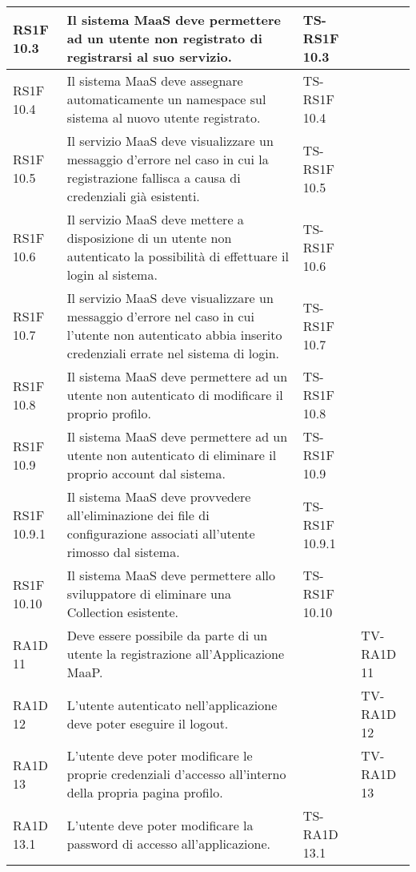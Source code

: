 \begin{center}
\begin{longtable}{| p{2cm} | p{6cm} | p{2.5cm} | p{2.5cm} | }
        RS1F 10.3 & 
        Il sistema MaaS deve permettere ad un utente non registrato di registrarsi al suo servizio. & TS-RS1F 10.3 & \\ \hline 
        RS1F 10.4 & 
        Il sistema MaaS deve assegnare automaticamente un namespace sul sistema al nuovo utente registrato. & TS-RS1F 10.4 & \\ \hline 
        RS1F 10.5 & 
        Il servizio MaaS deve visualizzare un messaggio d’errore nel caso in cui la registrazione fallisca a causa di credenziali già esistenti. & TS-RS1F 10.5 & \\ \hline 
        RS1F 10.6 & 
        Il servizio MaaS deve mettere a disposizione di un utente non autenticato la possibilità di effettuare il login al sistema. & TS-RS1F 10.6 & \\ \hline 
        RS1F 10.7 & 
        Il servizio MaaS deve visualizzare un messaggio d’errore nel caso in cui l’utente non autenticato abbia inserito credenziali errate nel sistema di login. & TS-RS1F 10.7 & \\ \hline 
        RS1F 10.8 & 
        Il sistema MaaS deve permettere ad un utente non autenticato di modificare il proprio profilo. & TS-RS1F 10.8 & \\ \hline 
        RS1F 10.9 & 
        Il sistema MaaS deve permettere ad un utente non autenticato di eliminare il proprio account dal sistema. & TS-RS1F 10.9 & \\ \hline 
        RS1F 10.9.1 & 
        Il sistema MaaS deve provvedere all’eliminazione dei file di configurazione associati all’utente rimosso dal sistema. & TS-RS1F 10.9.1 & \\ \hline 
        RS1F 10.10 & 
        Il sistema MaaS deve permettere allo sviluppatore di eliminare una Collection esistente. & TS-RS1F 10.10 & \\ \hline 
        RA1D 11 & 
        Deve essere possibile da parte di un utente la registrazione all’Applicazione MaaP. &  & TV-RA1D 11 \\ \hline 
        RA1D 12 & 
        L’utente autenticato nell’applicazione deve poter eseguire il logout. &  & TV-RA1D 12 \\ \hline 
        RA1D 13 & 
        L'utente deve poter modificare le proprie credenziali d'accesso all'interno della propria pagina profilo. &  & TV-RA1D 13 \\ \hline 
        RA1D 13.1 & 
        L’utente deve poter modificare la password di accesso all’applicazione. & TS-RA1D 13.1 & \\ \hline 

\end{longtable}
\end{center}
